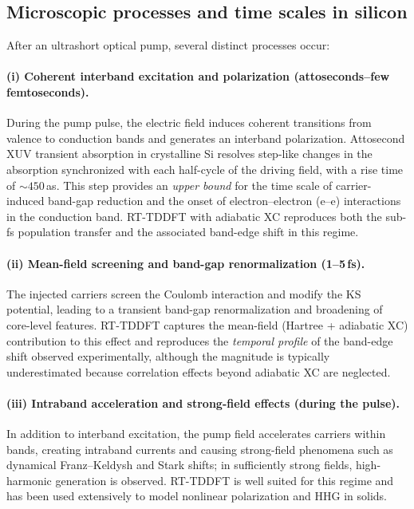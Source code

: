 \subsection{Microscopic processes and time scales in silicon}

After an ultrashort optical pump, several distinct processes occur:

\paragraph{(i) Coherent interband excitation and polarization (attoseconds--few femtoseconds).}
During the pump pulse, the electric field induces coherent transitions from valence to conduction bands and generates an interband polarization.
Attosecond XUV transient absorption in crystalline Si resolves step-like changes in the absorption synchronized with each half-cycle of the driving field, with a rise time of $\sim 450$\,as.\cite{Schultze2014}
This step provides an \emph{upper bound} for the time scale of carrier-induced band-gap reduction and the onset of electron--electron (e--e) interactions in the conduction band.\cite{Schultze2014}
RT-TDDFT with adiabatic XC reproduces both the sub-fs population transfer and the associated band-edge shift in this regime.\cite{Schultze2014,Yabana2012,Sato2025review}

\paragraph{(ii) Mean-field screening and band-gap renormalization (1--5\,fs).}
The injected carriers screen the Coulomb interaction and modify the KS potential, leading to a transient band-gap renormalization and broadening of core-level features.
RT-TDDFT captures the mean-field (Hartree + adiabatic XC) contribution to this effect and reproduces the \emph{temporal profile} of the band-edge shift observed experimentally, although the magnitude is typically underestimated because correlation effects beyond adiabatic XC are neglected.\cite{Schultze2014,Botti2007}

\paragraph{(iii) Intraband acceleration and strong-field effects (during the pulse).}
In addition to interband excitation, the pump field accelerates carriers within bands, creating intraband currents and causing strong-field phenomena such as dynamical Franz--Keldysh and Stark shifts; in sufficiently strong fields, high-harmonic generation is observed.
RT-TDDFT is well suited for this regime and has been used extensively to model nonlinear polarization and HHG in solids.\cite{Yabana2012,Uemoto2019,Sato2025review}


